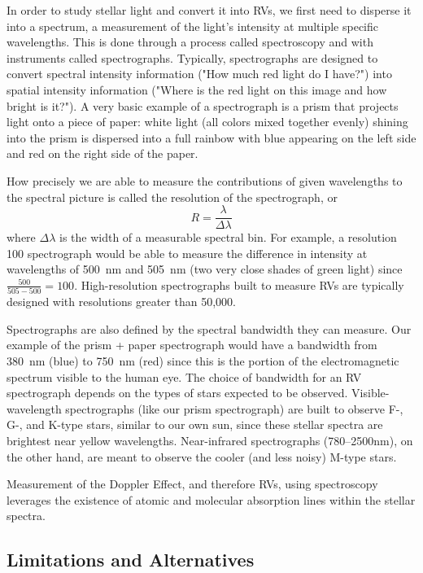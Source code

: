 In order to study stellar light and convert it into RVs, we first need to disperse it into a spectrum, a measurement of the light's intensity at multiple specific wavelengths. This is done through a process called spectroscopy and with instruments called spectrographs. Typically, spectrographs are designed to convert spectral intensity information ("How much red light do I have?") into spatial intensity information ("Where is the red light on this image and how bright is it?"). A very basic example of a spectrograph is a prism that projects light onto a piece of paper: white light (all colors mixed together evenly) shining into the prism is dispersed into a full rainbow with blue appearing on the left side and red on the right side of the paper.

How precisely we are able to measure the contributions of given wavelengths to the spectral picture is called the resolution of the spectrograph, or
\begin{equation}
    R = \frac{\lambda}{\Delta \lambda}
\end{equation}
where $\Delta \lambda$ is the width of a measurable spectral bin. For example, a resolution 100 spectrograph would be able to measure the difference in intensity at wavelengths of 500~nm and 505~nm (two very close shades of green light) since $\frac{500}{505-500} = 100$. High-resolution spectrographs built to measure RVs are typically designed with resolutions greater than 50,000.

Spectrographs are also defined by the spectral bandwidth they can measure. Our example of the prism + paper spectrograph would have a bandwidth from 380~nm (blue) to 750~nm (red) since this is the portion of the electromagnetic spectrum visible to the human eye. The choice of bandwidth for an RV spectrograph depends on the types of stars expected to be observed. Visible-wavelength spectrographs (like our prism spectrograph) are built to observe F-, G-, and K-type stars, similar to our own sun, since these stellar spectra are brightest near yellow wavelengths. Near-infrared spectrographs (780--2500nm), on the other hand, are meant to observe the cooler (and less noisy) M-type stars.

Measurement of the Doppler Effect, and therefore RVs, using spectroscopy leverages the existence of atomic and molecular absorption lines within the stellar spectra. 

\subsection{Limitations and Alternatives}

